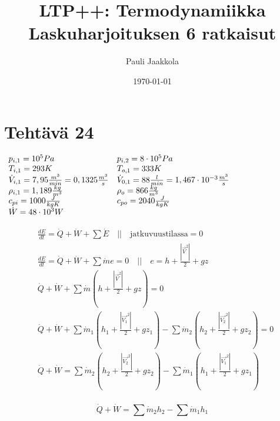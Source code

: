 \documentclass[12pt,a4paper,finnish]{article}
\title{LTP++: Termodynamiikka\\Laskuharjoituksen 6 ratkaisut}
\date{\today}
\author{Pauli Jaakkola}
\begin{document}
\maketitle
\tableofcontents
\newpage

\section{Tehtävä 24}

\begin{math}
 \begin{array}{l l}
  p_{i,1} = 10^5Pa & p_{i,2} = 8\cdot 10^5Pa \\
  T_{i,1} = 293K & T_{o,1} = 333 K \\
  \dot{V}_{i,1} = 7,95\frac{m^3}{min} = 0,1325\frac{m^3}{s} & \dot{V}_{0,1} = 88\frac{l}{min} = 1,467\cdot 10^{-3}\frac{m^3}{s}\\                      
  \rho_{i,1} = 1,189\frac{kg}{m^3} & \rho_o = 866\frac{kg}{m^3}\\
  c_{pi} = 1000\frac{J}{kgK} & c_{po} = 2040\frac{J}{kgK}\\
  \dot{W} = 48\cdot10^3W &
 \end{array}
\end{math}

\begin{align}
 & \frac{dE}{dt} = \dot{Q} + \dot{W} + \sum \dot{E} \quad \bigg|\bigg| \quad \text{jatkuvuustilassa} = 0\\
 & \frac{dE}{dt} = \dot{Q} + \dot{W} + \sum \dot{m}e = 0 
    \quad \bigg|\bigg| \quad e = h + \frac{|\vec{V}^2|}2 + gz\\
 & \dot{Q} + \dot{W} + \sum \dot{m}\left(h + \frac{|\vec{V}^2|}2 + gz\right) = 0\\
 & \dot{Q} + \dot{W} + \sum \dot{m}_1\left(h_1 + \frac{|\vec{V_1}^2|}2 + gz_1\right) 
  - \sum \dot{m}_2\left(h_2 + \frac{|\vec{V_2}^2|}2 + gz_2\right)= 0\\
 & \dot{Q} + \dot{W} = \sum \dot{m}_2\left(h_2 + \frac{|\vec{V_2}^2|}2 + gz_2\right) 
  - \sum \dot{m}_1\left(h_1 + \frac{|\vec{V_1}^2|}2 + gz_1\right)\\
\end{align}
  
\begin{framed}
 \begin{equation}
  \dot{Q} + \dot{W} = \sum \dot{m}_2h_2 - \sum \dot{m}_1h_1
 \end{equation}
\end{framed} 
 
\end{document}
